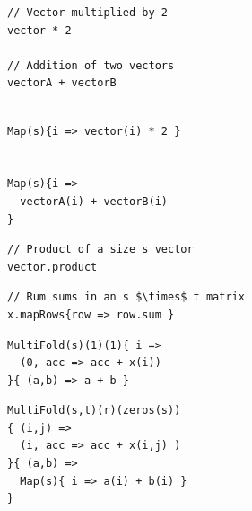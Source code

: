 \begin{figure}
\centering

\newsavebox{\MapHLL}
\begin{lrbox}{\MapHLL}
\begin{lstlisting}[language=PPLTable]
// Vector multiplied by 2
vector * 2

// Addition of two vectors
vectorA + vectorB
\end{lstlisting}
\end{lrbox}

\newsavebox{\MapPPL}
\begin{lrbox}{\MapPPL}
\begin{lstlisting}[language=PPLTable]

Map(s){i => vector(i) * 2 }


Map(s){i =>
  vectorA(i) + vectorB(i)
}
\end{lstlisting}
\end{lrbox}

\newsavebox{\MultiFoldHLLOne}
\begin{lrbox}{\MultiFoldHLLOne}
\begin{lstlisting}[language=PPLTable]
// Product of a size s vector
vector.product

\end{lstlisting}
\end{lrbox}

\newsavebox{\MultiFoldHLLTwo}
\begin{lrbox}{\MultiFoldHLLTwo}
\begin{lstlisting}[language=PPLTable]
// Rum sums in an s $\times$ t matrix
x.mapRows{row => row.sum }

\end{lstlisting}
\end{lrbox}

\newsavebox{\MultiFoldPPLOne}
\begin{lrbox}{\MultiFoldPPLOne}
\begin{lstlisting}[language=PPLTable]
MultiFold(s)(1)(1){ i =>
  (0, acc => acc + x(i))
}{ (a,b) => a + b }
\end{lstlisting}
\end{lrbox}

\newsavebox{\MultiFoldPPLTwo}
\begin{lrbox}{\MultiFoldPPLTwo}
\begin{lstlisting}[language=PPLTable]
MultiFold(s,t)(r)(zeros(s))
{ (i,j) =>
  (i, acc => acc + x(i,j) )
}{ (a,b) =>
  Map(s){ i => a(i) + b(i) }
}
\end{lstlisting}
\end{lrbox}


\end{figure}
